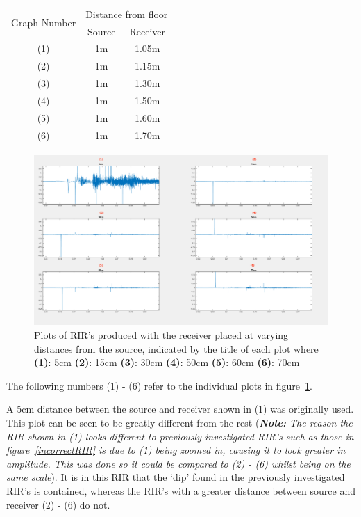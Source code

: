 \documentclass[../../main.tex]{subfiles}
\begin{document}
			 \begin{center}
				 \begin{tabular}{|c |c| c|}
				 \hline
				 \multirow{2}{*}{Graph Number} & \multicolumn{2}{|c|}{Distance from floor} \\ \cline{2-3}
				 & Source & Receiver \\\hline
				 (1) & 1m & 1.05m \\
				 (2) & 1m & 1.15m \\
				 (3) & 1m & 1.30m \\
				 (4) & 1m & 1.50m \\
				 (5) & 1m & 1.60m \\
				 (6) & 1m & 1.70m \\ \hline
				 \end{tabular}
			 \end{center}

			\begin{figure}[H]
				\centerline{\includegraphics[scale = 0.3]{Sections/Implementation/Odeon/images/incorrectRIR/HeightTest_Edit.png}}
				\caption{Plots of \ac{RIR}'s produced with the receiver placed at varying distances from the source, indicated by the title of each plot where \textbf{(1)}: 5cm \textbf{(2)}: 15cm \textbf{(3)}: 30cm \textbf{(4)}: 50cm \textbf{(5)}: 60cm \textbf{(6)}: 70cm}
				\label{HeightTest}
			\end{figure}

			The following numbers (1) - (6) refer to the individual plots in figure~\ref{HeightTest}.

			A 5cm distance between the source and receiver shown in (1) was originally used. This plot can be seen to be greatly different from the rest (\textit{\textbf{Note:} The reason the \ac{RIR} shown in (1) looks different to previously investigated \ac{RIR}'s such as those in figure~\ref{incorrectRIR} is due to (1) being zoomed in, causing it to look greater in amplitude. This was done so it could be compared to (2) - (6) whilst being on the same scale}). It is in this \ac{RIR} that the `dip' found in the previously investigated \ac{RIR}'s is contained, whereas the \ac{RIR}'s with a greater distance between source and receiver (2) - (6) do not.
\end{document}
